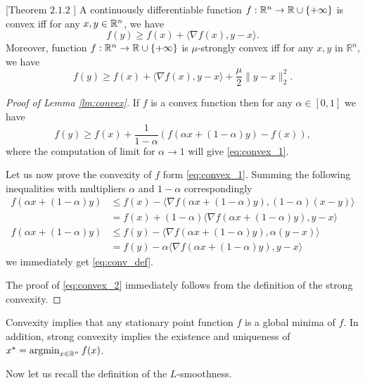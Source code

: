 \begin{lemma}\label{lm:convex}[Theorem $2.1.2$ \cite{nesterov-book}]
    A continuously differentiable function $f:\mathbb{R}^n\rightarrow \mathbb{R}\cup\{+\infty\}$ is convex iff for any $x,y\in\mathbb{R}^n$, we have
    \begin{equation}\label{eq:convex_1}
        f(y) \geq f(x) + \langle \nabla f(x), y-x\rangle.
    \end{equation}
    Moreover, function $f:\mathbb{R}^n\rightarrow \mathbb{R}\cup\{+\infty\}$ is $\mu$-strongly convex iff for any $x,y$ in $\mathbb{R}^n$, we have
    \begin{equation}\label{eq:convex_2}
        f(y) \geq f(x) + \langle \nabla f(x), y-x\rangle + \frac{\mu}{2}\|y-x\|_2^2.
    \end{equation}
\end{lemma}
\begin{proof}[Proof of Lemma \ref{lm:convex}]
If $f$ is a convex function then for any $\alpha\in[0,1]$ we have 
$$
f(y)\geq f(x) +\frac{1}{1-\alpha}\left(f(\alpha x + (1-\alpha)y) - f(x)\right),
$$
where the computation of limit for $\alpha \rightarrow 1$ will give \eqref{eq:convex_1}.

Let us now prove the convexity of $f$ form \eqref{eq:convex_1}.
Summing the following inequalities with multipliers $\alpha$ and $1-\alpha$ correspondingly
\begin{align*}
f(\alpha x + (1-\alpha)y) &\leq f(x) - \langle \nabla f(\alpha x + (1-\alpha)y), (1-\alpha)(x-y)\rangle\\
&= f(x) + (1-\alpha) \langle \nabla f(\alpha x + (1-\alpha)y), y-x\rangle\\
f(\alpha x + (1-\alpha)y)&\leq f(y) - \langle \nabla f(\alpha x + (1-\alpha)y), \alpha(y-x)\rangle\\&= f(y) - \alpha \langle \nabla f(\alpha x + (1-\alpha)y), y-x\rangle
\end{align*}
we immediately get \eqref{eq:conv_def}. 

The proof of \eqref{eq:convex_2} immediately follows from the definition of the strong convexity.
\end{proof}

Convexity implies that any stationary point function $f$ is a global minima of $f$. In addition, strong convexity implies the existence and uniqueness of $x^\star = \operatorname*{argmin}_{x\in\mathbb{R}^n} f(x)$.

Now let us recall the definition of the $L$-smoothness. 

